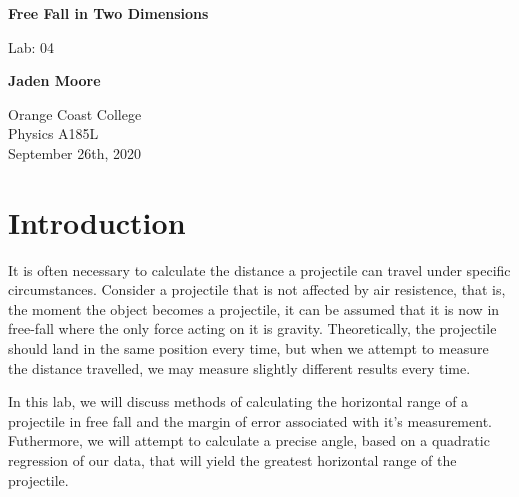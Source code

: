 \documentclass[12pt]{article}
\begin{document}

\begin{titlepage}
    \begin{center}
        \vspace*{1cm}
        \textbf{Free Fall in Two Dimensions}

        \vspace{0.5cm}
        Lab: 04

        \vspace{1cm}

        \textbf{Jaden Moore}

        \vfill

        Orange Coast College\\
        Physics A185L\\
        September 26th, 2020

    \end{center}
\end{titlepage}

\pagestyle{fancy}
\fancyhf{}
\setlength{\headheight}{15pt}
\cfoot{\thepage}



\section{Introduction}
It is often necessary to calculate the distance a projectile can travel under specific circumstances. Consider a projectile that is not affected by air resistence, that is, the moment the object becomes a projectile, it can be assumed that it is now in free-fall where the only force acting on it is gravity. Theoretically, the projectile should land in the same position every time, but when we attempt to measure the distance travelled, we may measure slightly different results every time.

In this lab, we will discuss methods of calculating the  horizontal range of a projectile in free fall and the margin of error associated with it's measurement. Futhermore, we will attempt to calculate a precise angle, based on a quadratic regression of our data, that will yield the greatest horizontal range of the projectile.
\end{document}
